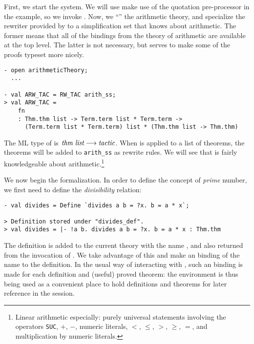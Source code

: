 First, we start the system. We will use make use of the quotation
pre-processor in the example, so we invoke
.  Now, we ``'' the
arithmetic theory, and specialize the rewriter provided by
 to a simplification set that knows about arithmetic.  The
former means that all of the \ML{} bindings from the \HOL{} theory of
arithmetic are available at the top level.  The latter is not
necessary, but serves to make some of the proofs typeset more nicely.
\begin{session}
\begin{verbatim}
- open arithmeticTheory;
  ...

- val ARW_TAC = RW_TAC arith_ss;
> val ARW_TAC =
    fn
    : Thm.thm list -> Term.term list * Term.term ->
      (Term.term list * Term.term) list * (Thm.thm list -> Thm.thm)
\end{verbatim}
\end{session}
The ML type of  is $\mbox{\it thm list} \longrightarrow
\mbox{\it tactic}$. When  is applied to a list of theorems, the
theorems will be added to \verb+arith_ss+ as rewrite rules.  We will see
that  is fairly knowledgeable about
arithmetic.\footnote{Linear arithmetic especially: purely universal
statements involving the operators {\tt SUC}, $+$, $-$, numeric
literals, $<$, $\leq$, $>$, $\geq$, $=$, and multiplication by numeric
literals.}

We now begin the formalization. In order to define the concept of  \emph
{prime} number, we first need to define the \emph{divisibility} relation:

\begin{session}\begin{verbatim}
- val divides = Define `divides a b = ?x. b = a * x`;

> Definition stored under "divides_def".
> val divides = |- !a b. divides a b = ?x. b = a * x : Thm.thm
\end{verbatim}\end{session}
    The definition is added to the current theory with the name
    , and also returned from the invocation of
    . We take advantage of this and make an \ML{} binding
    of the name  to the definition. In the usual way of
    interacting with \HOL, such an \ML{} binding is made for each
    definition and (useful) proved theorem: the \ML{} environment is
    thus being used as a convenient place to hold definitions and
    theorems for later reference in the session.

